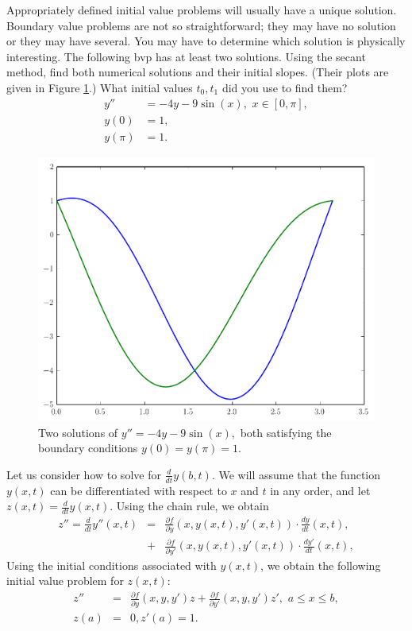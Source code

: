 \begin{problem}
Appropriately defined initial value problems will usually have a unique solution.
Boundary value problems are not so straightforward; they may have no solution or they may have several.
You may have to determine which solution is physically interesting.
The following bvp has at least two solutions.
Using the secant method, find both numerical solutions and their initial slopes.
(Their plots are given in Figure \ref{prob:shooting1}.)
What initial values $t_0, t_1$ did you use to find them?
\begin{equation*}
\begin{split}
y'' &= -4y -9\sin(x), \,\, x \in [0,\pi],\\
y(0) &= 1, \\
y(\pi) &=1.
\end{split}
\end{equation*}

\begin{figure}[H]
\includegraphics[width=\textwidth]{Fig1.pdf}
\caption{Two solutions of $y'' = -4y -9\sin(x),$ both satisfying the boundary conditions $y(0) = y(\pi) = 1.$}
\label{prob:shooting1}
\end{figure}
\end{problem}

Let us consider how to solve for $\frac{d}{dt} y(b,t)$.
We will assume that the function $y(x,t)$ can be differentiated with respect to $x$ and $t$ in any order, and let  $z(x,t) = \frac{d}{dt} y(x,t).$
Using the chain rule, we obtain
\begin{eqnarray*}
z'' = \frac{d}{dt} y''(x,t) &=& \frac{\partial f}{\partial y} (x,y(x,t),y'(x,t)) \cdot \frac{dy}{dt}(x,t) ,\\
&+& \frac{\partial f}{\partial y'} (x,y(x,t),y'(x,t)) \cdot \frac{dy'}{dt}(x,t),
\end{eqnarray*}
Using the initial conditions associated with $y(x,t)$, we obtain the following initial value problem for $z(x,t)$:
\begin{eqnarray*}
z'' &=& \frac{\partial f}{\partial y} (x,y,y') z + \frac{\partial f}{\partial y'} (x,y,y') z'
,\,\,a \leq x \leq b, \\
 z(a) &=& 0, z'(a) = 1.
\end{eqnarray*}

